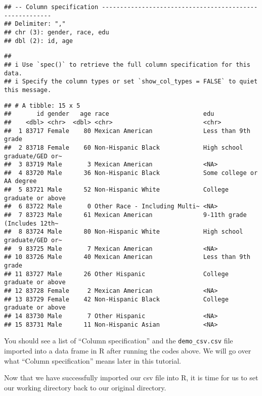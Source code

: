 \documentclass[
]{book}
\begin{document}
\begin{verbatim}
## -- Column specification --------------------------------------------------------
## Delimiter: ","
## chr (3): gender, race, edu
## dbl (2): id, age
\end{verbatim}

\begin{verbatim}
## 
## i Use `spec()` to retrieve the full column specification for this data.
## i Specify the column types or set `show_col_types = FALSE` to quiet this message.
\end{verbatim}

\begin{verbatim}
## # A tibble: 15 x 5
##       id gender   age race                          edu                         
##    <dbl> <chr>  <dbl> <chr>                         <chr>                       
##  1 83717 Female    80 Mexican American              Less than 9th grade         
##  2 83718 Female    60 Non-Hispanic Black            High school graduate/GED or~
##  3 83719 Male       3 Mexican American              <NA>                        
##  4 83720 Male      36 Non-Hispanic Black            Some college or AA degree   
##  5 83721 Male      52 Non-Hispanic White            College graduate or above   
##  6 83722 Male       0 Other Race - Including Multi~ <NA>                        
##  7 83723 Male      61 Mexican American              9-11th grade (Includes 12th~
##  8 83724 Male      80 Non-Hispanic White            High school graduate/GED or~
##  9 83725 Male       7 Mexican American              <NA>                        
## 10 83726 Male      40 Mexican American              Less than 9th grade         
## 11 83727 Male      26 Other Hispanic                College graduate or above   
## 12 83728 Female     2 Mexican American              <NA>                        
## 13 83729 Female    42 Non-Hispanic Black            College graduate or above   
## 14 83730 Male       7 Other Hispanic                <NA>                        
## 15 83731 Male      11 Non-Hispanic Asian            <NA>
\end{verbatim}

You should see a list of ``Column specification'' and the \texttt{demo\_csv.csv} file imported into a data frame in R after running the codes above. We will go over what ``Column specification'' means later in this tutorial.

Now that we have successfully imported our csv file into R, it is time for us to set our working directory back to our original directory.
\end{document}
